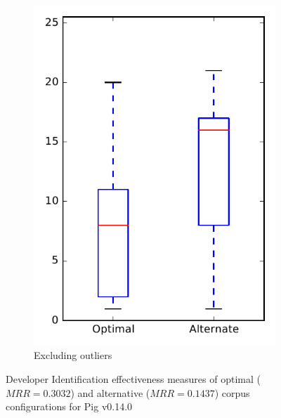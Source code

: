 \begin{figure}
\begin{subfigure}{.4\textwidth}
        \includegraphics[height=0.4\textheight]{figures/combo/dit_rq2_pig_no_outlier}
        \caption{Excluding outliers}\label{fig:combo:dit:rq2:pig_no_outlier}
    \end{subfigure}
\caption[Developer Identification effectiveness measures of optimal and alternative corpus configurations for Pig v0.14.0]%
{Developer Identification effectiveness measures of optimal ($MRR=0.3032$) and alternative ($MRR=0.1437$) corpus configurations for Pig v0.14.0}
\label{fig:combo:dit:rq2:pig}
\end{figure}
